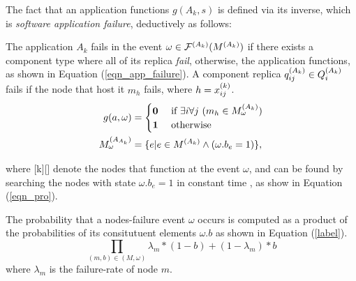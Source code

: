 The fact that an application functions $g(A_k, s)$ is defined via its inverse, which is \textit{software application failure}, deductively as follows:
\begin{definition}
The application $A_k$ fails in the event $\omega \in \ttssp{\mathcal{F}}(\ttssp{M})$ if there exists a component type  where all of its replica  \textit{fail}, otherwise, the application functions, as shown in Equation (\ref{eqn_app_failure}).  A component replica $\ttsss{q}[k][ij]\in \ttsss{Q}$ fails if the node that host it $m_h$ fails, where $h=x^{(k)}_{ij}$.  
\begin{align}
\label{eqn_app_failure}
g(a, \omega)&= 
\begin{cases}
\textbf{0} & \mbox{ if } \exists i\forall j\ (m_h\in \ttsss{M}[k][\omega] )\\
\textbf{1} & \mbox{ otherwise }
\end{cases}\\
\label{eqn_appreliability_node_s}
\ttsss{M}[A_k][\omega]&=\{e|e\in \ttssp{M} \land (\omega.b_e=1) \},
\end{align}
\end{definition}
where [k][\omega] denote the nodes that function at the event $\omega$, and can be found by searching the nodes  with state $\omega.b_e=1$ in constant time , as show in Equation (\ref{eqn_pro}).

The probability that a nodes-failure event $\omega$ occurs is computed as a product of the probabilities of its consitutuent elements $\omega.b$ as shown in Equation (\ref{label}).
\begin{equation}
\label{eqn_pro}
	\prod_{(m,b)\in (M,\omega)}{\lambda_m*(1-b)+(1-\lambda_m)*b}
\end{equation}
where $\lambda_m$ is the failure-rate of node $m$.

